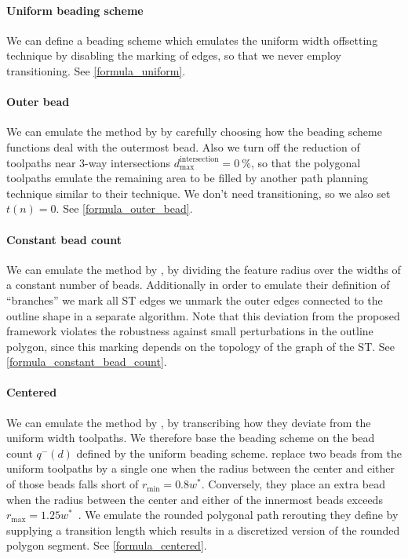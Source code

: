 \paragraph{Uniform beading scheme}
We can define a beading scheme which emulates the uniform width offsetting technique by disabling the marking of edges, so that we never employ transitioning.
See \cref{formula_uniform}.


\paragraph{Outer bead}
We can emulate the method by \citeauthor{Moesen2011} by carefully choosing how the beading scheme functions deal with the outermost bead.
Also we turn off the reduction of toolpaths near 3-way intersections $d_\text{max}^\text{intersection} = \SI{0}{\percent}$, so that the polygonal toolpaths emulate the remaining area to be filled by another path planning technique similar to their technique.
We don't need transitioning, so we also set $t(n) = 0 $.
See \cref{formula_outer_bead}.



\paragraph{Constant bead count}
We can emulate the method by \citeauthor{Ding2016a}, by dividing the feature radius over the widths of a constant number of beads.
Additionally in order to emulate their definition of ``branches'' we mark all ST edges we unmark the outer edges connected to the outline shape in a separate algorithm.
Note that this deviation from the proposed framework violates the robustness against small perturbations in the outline polygon, since this marking depends on the topology of the graph of the ST.
See \cref{formula_constant_bead_count}.




\paragraph{Centered}
We can emulate the method by \citeauthor{Jin2017JMS}, by transcribing how they deviate from the uniform width toolpaths.
We therefore base the beading scheme on the bead count $q^-(d)$ defined by the uniform beading scheme.
\citeauthor{Jin2017JMS} replace two beads from the uniform toolpaths by a single one when the radius between the center and either of those beads falls short of $r_\text{min} = 0.8 w^*$.
Conversely, they place an extra bead when the radius between the center and either of the innermost beads exceeds $r_\text{max} = 1.25 w^*$~\cite{Jin2017JMS}.
We emulate the rounded polygonal path rerouting they define by supplying a transition length which results in a discretized version of the rounded polygon segment.
See \cref{formula_centered}.






